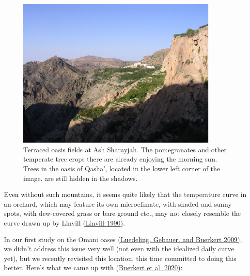 \documentclass[
]{book}
\begin{document}
\begin{figure}
\centering
\includegraphics[width=0.9\textwidth,height=\textheight]{pictures/IMG_8487.JPG}
\caption{Terraced oasis fields at Ash Sharayjah. The pomegranates and other temperate tree crops there are already enjoying the morning sun. Trees in the oasis of Qasha', located in the lower left corner of the image, are still hidden in the shadows.}
\end{figure}

Even without such mountains, it seems quite likely that the temperature curve in an orchard, which may feature its own microclimate, with shaded and sunny spots, with dew-covered grass or bare ground etc., may not closely resemble the curve drawn up by Linvill \href{https://journals.ashs.org/hortsci/view/journals/hortsci/25/1/article-p14.xml}{(Linvill \protect\hyperlink{ref-linvill1990calculating}{1990})}.

In our first study on the Omani oases \href{https://link.springer.com/article/10.1007/s10584-009-9581-7}{(Luedeling, Gebauer, and Buerkert \protect\hyperlink{ref-luedeling_climate_2009}{2009})}, we didn't address this issue very well (not even with the idealized daily curve yet), but we recently revisited this location, this time committed to doing this better. Here's what we came up with \href{https://link.springer.com/article/10.1007/s10584-020-02862-8}{(Buerkert et al. \protect\hyperlink{ref-buerkert2020revisiting}{2020})}:
\end{document}

